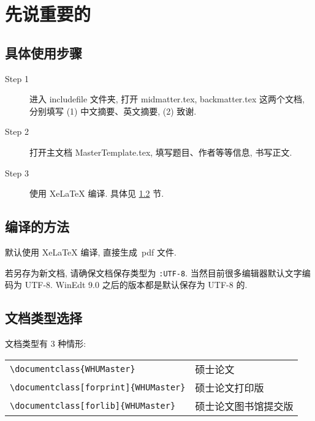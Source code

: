 \documentclass{WHUMaster}   %
\begin{document}
\chapter{先说重要的}

\section{具体使用步骤}
\begin{description}

  \item[Step 1]  进入 includefile 文件夹,  打开 midmatter.tex,  backmatter.tex 这两个文档,
        分别填写 (1) 中文摘要、英文摘要, (2) 致谢.

  \item[Step 2]  打开主文档 MasterTemplate.tex, 填写题目、作者等等信息, 书写正文.

  \item[Step 3]  使用 XeLaTeX 编译. 具体见 \ref{sec-compile} 节.


\end{description}




\section{编译的方法}\label{sec-compile}

默认使用 XeLaTeX 编译, 直接生成~pdf 文件.

若另存为新文档, 请确保文档保存类型为 \verb|:UTF-8|. 当然目前很多编辑器默认文字编码为 UTF-8.
WinEdt 9.0 之后的版本都是默认保存为 UTF-8 的.



\section{文档类型选择}
文档类型有 3 种情形:

\begin{table}[ht]\centering
\begin{tabular}{ll}
\hline
   \verb|\documentclass{WHUMaster}|                 &  硕士论文 \\
   \verb|\documentclass[forprint]{WHUMaster}|    &  硕士论文打印版  \\
   \verb|\documentclass[forlib]{WHUMaster}|       &  硕士论文图书馆提交版  \\
\hline
\end{tabular}
\end{table}
\end{document}
